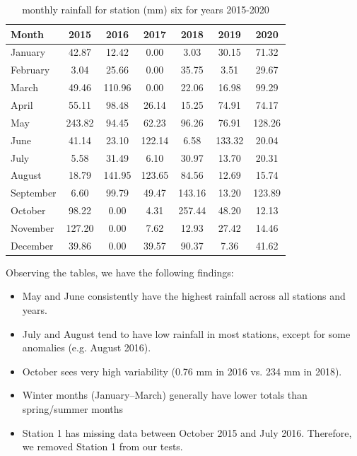 \documentclass[12pt]{article}
\theoremstyle{definition}
\begin{document}
\begin{table}[ht]
  \centering
  \caption{monthly rainfall for station (mm) six for years 2015-2020}
  \label{tab:station6}
  \begin{tabular}{l *{6}{S[table-format=3.2]}}
    \toprule
    \textbf{Month} & \textbf{2015} & \textbf{2016} & \textbf{2017} & \textbf{2018} & \textbf{2019} & \textbf{2020} \\
    \midrule
    January  & 42.87 & 12.42 &  0.00 &  3.03 & 30.15 & 71.32 \\
    February &  3.04 & 25.66 &  0.00 & 35.75 &  3.51 & 29.67 \\
    March    & 49.46 &110.96 &  0.00 & 22.06 & 16.98 & 99.29 \\
    April    & 55.11 & 98.48 & 26.14 & 15.25 & 74.91 & 74.17 \\
    May      &243.82 & 94.45 & 62.23 & 96.26 & 76.91 &128.26 \\
    June     & 41.14 & 23.10 &122.14 &  6.58 &133.32 & 20.04 \\
    July     &  5.58 & 31.49 &  6.10 & 30.97 & 13.70 & 20.31 \\
    August   & 18.79 &141.95 &123.65 & 84.56 & 12.69 & 15.74 \\
    September&  6.60 & 99.79 & 49.47 &143.16 & 13.20 &123.89 \\
    October  & 98.22 &  0.00 &  4.31 &257.44 & 48.20 & 12.13 \\
    November &127.20 &  0.00 &  7.62 & 12.93 & 27.42 & 14.46 \\
    December & 39.86 &  0.00 & 39.57 & 90.37 &  7.36 & 41.62 \\
    \bottomrule
  \end{tabular}
\end{table}
\clearpage
Observing the tables, we have the following findings: 
\begin{itemize}
    \item May and June consistently have the highest rainfall across all stations and years.
    \item July and August tend to have low rainfall in most stations, except for some anomalies (e.g. August 2016).
    \item October sees very high variability (0.76 mm in 2016 vs. 234 mm in 2018).
    \item Winter months (January–March) generally have lower totals than spring/summer months
    \item Station 1 has missing data between October 2015 and July 2016. Therefore, we removed Station 1 from our tests.
\end{itemize}
\end{document}
